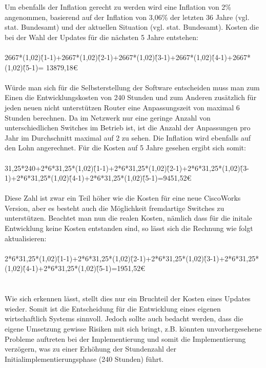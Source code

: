 Um ebenfalls der Inflation gerecht zu werden wird eine Inflation von 2\% angenommen, basierend auf der Inflation von 3,06\% der letzten 36 Jahre (vgl. stat. Bundesamt) und der aktuellen Situation (vgl. stat. Bundesamt).
Kosten die bei der Wahl der Updates für die nächsten 5 Jahre entstehen:\\
\\
2667*(1,02)\^(1-1)+2667*(1,02)\^(2-1)+2667*(1,02)\^(3-1)+2667*(1,02)\^(4-1)+2667*(1,02)\^(5-1)=
13879,18€\\
\\
Würde man sich für die Selbsterstellung der Software entscheiden muss man zum Einen die Entwicklungskosten von 240 Stunden und zum Anderen zusätzlich für jeden neuen nicht unterstützen Router eine Anpassungszeit von maximal 6 Stunden berechnen. Da im Netzwerk nur eine geringe Anzahl von unterschiedlichen Switches im Betrieb ist, ist die Anzahl der Anpassungen pro Jahr im Durchschnitt maximal auf 2 zu sehen. Die Inflation wird ebenfalls auf den Lohn angerechnet. Für die Kosten auf 5 Jahre gesehen ergibt sich somit:\\
\\
31,25*240+2*6*31,25*(1,02)\^(1-1)+2*6*31,25*(1,02)\^(2-1)+2*6*31,25*(1,02)\^(3-1)+2*6*31,25*(1,02)\^(4-1)+2*6*31,25*(1,02)\^(5-1)=9451,52€\\
\\
Diese Zahl ist zwar ein Teil höher wie die Kosten für eine neue CiscoWorks Version, aber es besteht auch die Möglichkeit fremdartige Switches zu unterstützen. Beachtet man nun die realen Kosten, nämlich dass für die initale Entwicklung keine Kosten entstanden sind, so lässt sich die Rechnung wie folgt aktualisieren:\\
\\
2*6*31,25*(1,02)\^(1-1)+2*6*31,25*(1,02)\^(2-1)+2*6*31,25*(1,02)\^(3-1)+2*6*31,25*(1,02)\^(4-1)+2*6*31,25*(1,02)\^(5-1)=1951,52€\\
\\
\\
Wie sich erkennen lässt, stellt dies nur ein Bruchteil der Kosten eines Updates wieder.
Somit ist die Entscheidung für die Entwicklung eines eigenen wirtschaftlich Systems sinnvoll.
Jedoch sollte auch bedacht werden, dass die eigene Umsetzung gewisse Risiken mit sich bringt, z.B. könnten unvorhergesehene Probleme auftreten bei der Implementierung und somit die Implementierung verzögern, was zu einer Erhöhung der Stundenzahl der Initialimplementierungsphase (240 Stunden) führt.\\